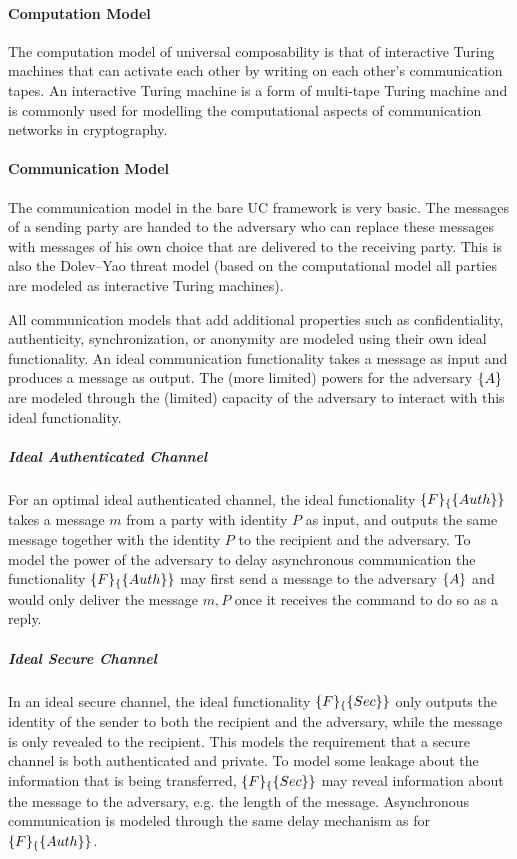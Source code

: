 \documentclass{article}
\begin{document}
\paragraph{Computation Model}

The computation model of universal composability is that of interactive Turing
machines that can activate each other by writing on each other's communication
tapes. An interactive Turing machine is a form of multi-tape Turing machine and
is commonly used for modelling the computational aspects of communication
networks in cryptography.

\paragraph{Communication Model}

The communication model in the bare UC framework is very basic. The messages of
a sending party are handed to the adversary who can replace these messages with
messages of his own choice that are delivered to the receiving party. This is
also the Dolev--Yao threat model (based on the computational model all parties
are modeled as interactive Turing machines).

All communication models that add additional properties such as confidentiality,
authenticity, synchronization, or anonymity are modeled using their own ideal
functionality. An ideal communication functionality takes a message as input and
produces a message as output. The (more limited) powers for the adversary
$\mathcal\{A\}$ are modeled through the (limited) capacity of the adversary to
interact with this ideal functionality.

\subparagraph{Ideal Authenticated Channel}

For an optimal ideal authenticated channel, the ideal functionality
$\mathcal\{F\}_\{\mathsf\{Auth\}\}$ takes a message $m$ from a party with identity $P$
as input, and outputs the same message together with the identity $P$ to the
recipient and the adversary. To model the power of the adversary to delay
asynchronous communication the functionality $\mathcal\{F\}_\{\mathsf\{Auth\}\}$ may
first send a message to the adversary $\mathcal\{A\}$ and would only deliver the
message $m,P$ once it receives the command to do so as a reply.

\subparagraph{Ideal Secure Channel}

In an ideal secure channel, the ideal functionality $\mathcal\{F\}_\{\mathsf\{Sec\}\}$
only outputs the identity of the sender to both the recipient and the adversary,
while the message is only revealed to the recipient. This models the requirement
that a secure channel is both authenticated and private. To model some leakage
about the information that is being transferred, $\mathcal\{F\}_\{\mathsf\{Sec\}\}$
may reveal information about the message to the adversary, e.g. the length of
the message. Asynchronous communication is modeled through the same delay
mechanism as for $\mathcal\{F\}_\{\mathsf\{Auth\}\}$.
\end{document}
